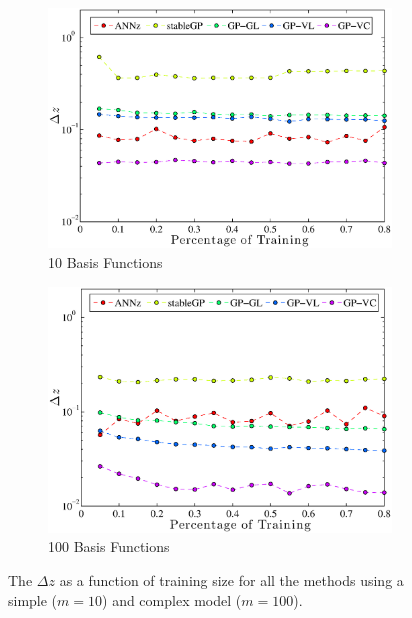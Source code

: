 \documentclass[useAMS,usenatbib,fleqn]{mn2e}
\begin{document}
\begin{figure}
        \centering
        \begin{subfigure}[b]{\columnwidth}
                \includegraphics[width=\textwidth]{figures/percentage10.eps}
                \caption{10 Basis Functions}
                \label{fig-training-percentage-10}
        \end{subfigure}	
        \begin{subfigure}[b]{\columnwidth}
                \includegraphics[width=\textwidth]{figures/percentage100.eps}
                \caption{100 Basis Functions}
                \label{ffig-training-percentage-100}
        \end{subfigure}
       \caption{The $\Delta z$ as a function of training size for all the methods using a simple ($m=10$) and complex model ($m=100$).}
	\label{fig-normal-balanced}
\end{figure}
\end{document}
